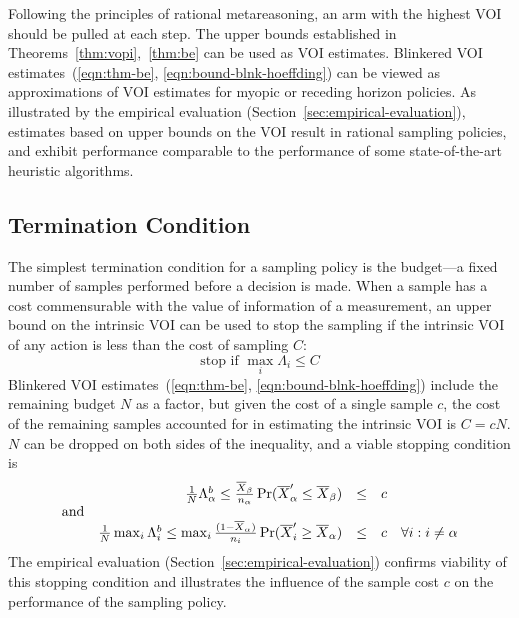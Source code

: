 \documentclass{article}
\begin{document}
Following the principles of rational metareasoning, an arm with
the highest VOI should be pulled at each step. The upper bounds
established in Theorems~\ref{thm:vopi},~\ref{thm:be} can be used
as VOI estimates. Blinkered VOI estimates~(\ref{eqn:thm-be},
 \ref{eqn:bound-blnk-hoeffding}) can be viewed
as approximations of VOI estimates for myopic or
receding horizon policies. As illustrated by the empirical evaluation
(Section~\ref{sec:empirical-evaluation}), estimates based on upper
bounds on the VOI result in rational sampling policies, and exhibit
performance comparable to the performance of some state-of-the-art
heuristic algorithms.

\subsection{Termination Condition}
\label{sec:control-termination-condition}

The simplest termination condition for a sampling policy is the
budget---a fixed number of samples performed before a decision is
made. When a sample has a cost commensurable with the value of
information of a measurement, an upper bound on the intrinsic VOI can
be used to stop the sampling if the intrinsic VOI of any action
is less than the cost of sampling $C$:
\begin{equation}
\mbox{stop if } \max_i \Lambda_i \le C
\end{equation}
Blinkered VOI estimates~(\ref{eqn:thm-be},
\ref{eqn:bound-blnk-hoeffding}) include the remaining budget $N$ as a
factor, but given the cost of a single sample $c$, the cost of the
remaining samples accounted for in estimating the intrinsic VOI is
$C=cN$. $N$ can be dropped on both sides of the inequality,
and a viable stopping condition is
\begin{equation}
\begin{array}{c r r l l}
&\frac 1 N \Lambda_\alpha^b
\le\frac {\overline  X_\beta} {n_\alpha}\Pr(\overline X_\alpha'\le\overline X_\beta)&\le& c
&\nonumber\\
\mbox{and}&&&&\nonumber\\
&\frac 1 N \max_i\Lambda_i^b
\le \max_i\frac {(1-\overline  X_\alpha)} {n_i}\Pr(\overline X_i'\ge\overline X_\alpha)&\le& c
 & \forall i: i\ne\alpha
\end{array}
\label{eqn:stopping-blnk}
\end{equation}
The empirical evaluation (Section~\ref{sec:empirical-evaluation})
confirms viability of this stopping condition and illustrates the
influence of the sample cost $c$ on the performance of
the sampling policy.
\end{document}
